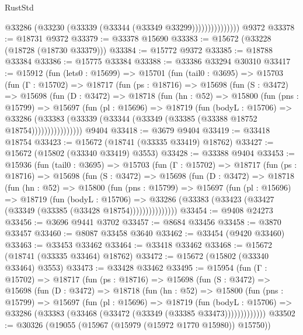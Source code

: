 \begin{lexlean}{RustStd}
\begin{coremodule}
                        @33286 (@33230 (@33339 (@33344 (@33349 @33299)))))))))))))))
    @9372
@33378 := @18731 @9372
@33379 := @33378 @15690
@33383 := @15672 (@33228 (@18728 (@18730 @33379)))
@33384 := @15772 @9372
@33385 := @18788 @33384
@33386 := @15775 @33384
@33388 := @33386 @33294 @30310
@33417 := @15912
    (fun (lets0 : @15699) =>
    @15701
      (fun (tail0 : @3695) =>
      @15703
        (fun (Γ : @15702) =>
        @18717
          (fun (ps : @18716) =>
          @15698
            (fun (S : @3472) =>
            @15698
              (fun (D : @3472) =>
              @18718
                (fun (hn : @52) =>
                @15800
                  (fun (pns : @15799) =>
                  @15697
                    (fun (pl : @15696) =>
                    @18719
                      (fun (bodyL : @15706) =>
                      @33286
                        (@33383
                          (@33339 (@33344 (@33349 (@33385 (@33388 @18752 @18754))))))))))))))))
    @9404
@33418 := @3679 @9404
@33419 := @33418 @18754
@33423 := @15672 (@18741 (@33335 @33419) @18762)
@33427 := @15672 (@15802 (@33340 @33419) @3553)
@33428 := @33388 @9404
@33453 := @15936
    (fun (tail0 : @3695) =>
    @15703
      (fun (Γ : @15702) =>
      @18717
        (fun (ps : @18716) =>
        @15698
          (fun (S : @3472) =>
          @15698
            (fun (D : @3472) =>
            @18718
              (fun (hn : @52) =>
              @15800
                (fun (pns : @15799) =>
                @15697
                  (fun (pl : @15696) =>
                  @18719
                    (fun (bodyL : @15706) =>
                    @33286 (@33383 (@33423 (@33427 (@33349 (@33385 (@33428 @18754)))))))))))))))
@33454 := @9408 @24273
@33456 := @3696 @9441 @3702
@33457 := @8684 @33456
@33458 := @3870 @33457
@33460 := @8087 @33458 @3640
@33462 := @33454 (@9420 @33460)
@33463 := @33453 @33462
@33464 := @33418 @33462
@33468 := @15672 (@18741 (@33335 @33464) @18762)
@33472 := @15672 (@15802 (@33340 @33464) @3553)
@33473 := @33428 @33462
@33495 := @15954
    (fun (Γ : @15702) =>
    @18717
      (fun (ps : @18716) =>
      @15698
        (fun (S : @3472) =>
        @15698
          (fun (D : @3472) =>
          @18718
            (fun (hn : @52) =>
            @15800
              (fun (pns : @15799) =>
              @15697
                (fun (pl : @15696) =>
                @18719
                  (fun (bodyL : @15706) =>
                  @33286 (@33383 (@33468 (@33472 (@33349 (@33385 @33473)))))))))))))
@33502 := @30326 (@19055 (@15967 (@15979 (@15972 @1770 @15980)) @15750))

\end{coremodule}
\end{lexlean}
